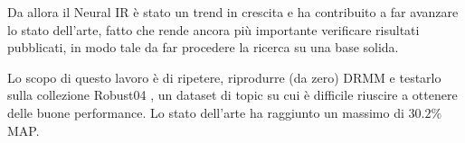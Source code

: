 Da allora il Neural IR è stato un trend in crescita e ha contribuito a far avanzare lo stato dell'arte, fatto che rende ancora più importante verificare risultati pubblicati, in modo tale da far procedere la ricerca su una base solida.

Lo scopo di questo lavoro è di ripetere, riprodurre (da zero) DRMM e testarlo sulla collezione Robust04 \cite{rob04}, un dataset di topic su cui è difficile riuscire a ottenere delle buone performance. Lo stato dell'arte ha raggiunto un massimo di $30.2 \%$ MAP.
